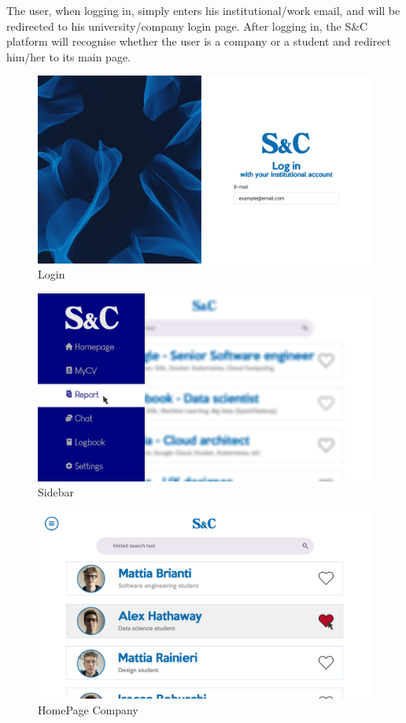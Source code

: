 
The user, when logging in, simply enters his institutional/work email, and will be redirected to his university/company login page. After logging in, the S\&C platform will recognise whether the user is a company or a student and redirect him/her to its main page.
\begin{figure}[H]
    \centering
    \includegraphics[width=\textwidth]{../images/login.png}
    \caption{Login}
    \label{fig:Login}
\end{figure}
\begin{figure}[H]
    \centering
    \includegraphics[width=\textwidth]{../images/sidebar.png}
    \caption{Sidebar}
    \label{fig:Sidebar}
\end{figure}
\begin{figure}[H]
    \centering
    \includegraphics[width=\textwidth]{../images/Homepage_Company.png}
    \caption{HomePage Company}
    \label{fig:HomePage Company}
\end{figure}
